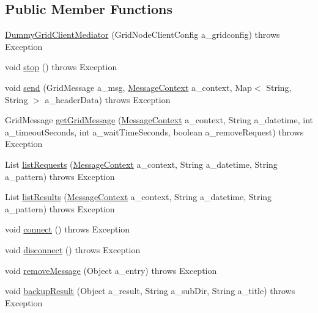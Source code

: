 \subsection*{Public Member Functions}
\begin{DoxyCompactItemize}
\item 
\hyperlink{classorg_1_1jgap_1_1distr_1_1grid_1_1_dummy_grid_client_mediator_a201b886400a332631434c618dd33633a}{Dummy\-Grid\-Client\-Mediator} (Grid\-Node\-Client\-Config a\-\_\-gridconfig)  throws Exception 
\item 
void \hyperlink{classorg_1_1jgap_1_1distr_1_1grid_1_1_dummy_grid_client_mediator_add00b971fe4812626f1e952d8da2648f}{stop} ()  throws Exception 
\item 
void \hyperlink{classorg_1_1jgap_1_1distr_1_1grid_1_1_dummy_grid_client_mediator_a4f94da08e9439931b276891b3a6150ce}{send} (Grid\-Message a\-\_\-msg, \hyperlink{classorg_1_1jgap_1_1distr_1_1grid_1_1_message_context}{Message\-Context} a\-\_\-context, Map$<$ String, String $>$ a\-\_\-header\-Data)  throws Exception 
\item 
Grid\-Message \hyperlink{classorg_1_1jgap_1_1distr_1_1grid_1_1_dummy_grid_client_mediator_a7212ea568d78375a552bc599e62e4648}{get\-Grid\-Message} (\hyperlink{classorg_1_1jgap_1_1distr_1_1grid_1_1_message_context}{Message\-Context} a\-\_\-context, String a\-\_\-datetime, int a\-\_\-timeout\-Seconds, int a\-\_\-wait\-Time\-Seconds, boolean a\-\_\-remove\-Request)  throws Exception 
\item 
List \hyperlink{classorg_1_1jgap_1_1distr_1_1grid_1_1_dummy_grid_client_mediator_a950d64600cc838a85c06f497b0075ce0}{list\-Requests} (\hyperlink{classorg_1_1jgap_1_1distr_1_1grid_1_1_message_context}{Message\-Context} a\-\_\-context, String a\-\_\-datetime, String a\-\_\-pattern)  throws Exception 
\item 
List \hyperlink{classorg_1_1jgap_1_1distr_1_1grid_1_1_dummy_grid_client_mediator_afade62453ebe98f4c8361c40777cc987}{list\-Results} (\hyperlink{classorg_1_1jgap_1_1distr_1_1grid_1_1_message_context}{Message\-Context} a\-\_\-context, String a\-\_\-datetime, String a\-\_\-pattern)  throws Exception 
\item 
void \hyperlink{classorg_1_1jgap_1_1distr_1_1grid_1_1_dummy_grid_client_mediator_a6f464e99178fe73142944a3a134389a0}{connect} ()  throws Exception 
\item 
void \hyperlink{classorg_1_1jgap_1_1distr_1_1grid_1_1_dummy_grid_client_mediator_a1f30008ccd49b0ad0762d450796b9f43}{disconnect} ()  throws Exception 
\item 
void \hyperlink{classorg_1_1jgap_1_1distr_1_1grid_1_1_dummy_grid_client_mediator_a0c5ffc3df90242b0f79261e6a9fed827}{remove\-Message} (Object a\-\_\-entry)  throws Exception 
\item 
void \hyperlink{classorg_1_1jgap_1_1distr_1_1grid_1_1_dummy_grid_client_mediator_ad75ecd94f86875a82de94a4ccf83d6ce}{backup\-Result} (Object a\-\_\-result, String a\-\_\-sub\-Dir, String a\-\_\-title)  throws Exception 
\end{DoxyCompactItemize}
